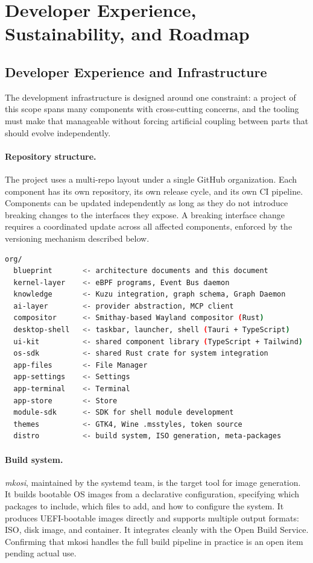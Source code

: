 \section{Developer Experience, Sustainability, and Roadmap}
\label{sec:sustainability}

\subsection{Developer Experience and Infrastructure}
\label{sec:devex}

The development infrastructure is designed around one constraint: a project of
this scope spans many components with cross-cutting concerns, and the tooling
must make that manageable without forcing artificial coupling between parts
that should evolve independently.

\paragraph{Repository structure.}
The project uses a multi-repo layout under a single GitHub organization. Each
component has its own repository, its own release cycle, and its own CI
pipeline. Components can be updated independently as long as they do not
introduce breaking changes to the interfaces they expose. A breaking interface
change requires a coordinated update across all affected components, enforced
by the versioning mechanism described below.

\begin{lstlisting}[language=bash, caption={Repository structure}]
org/
  blueprint       <- architecture documents and this document
  kernel-layer    <- eBPF programs, Event Bus daemon
  knowledge       <- Kuzu integration, graph schema, Graph Daemon
  ai-layer        <- provider abstraction, MCP client
  compositor      <- Smithay-based Wayland compositor (Rust)
  desktop-shell   <- taskbar, launcher, shell (Tauri + TypeScript)
  ui-kit          <- shared component library (TypeScript + Tailwind)
  os-sdk          <- shared Rust crate for system integration
  app-files       <- File Manager
  app-settings    <- Settings
  app-terminal    <- Terminal
  app-store       <- Store
  module-sdk      <- SDK for shell module development
  themes          <- GTK4, Wine .msstyles, token source
  distro          <- build system, ISO generation, meta-packages
\end{lstlisting}

\paragraph{Build system.}
\emph{mkosi}, maintained by the systemd team, is the target tool for image
generation. It builds bootable OS images from a declarative configuration,
specifying which packages to include, which files to add, and how to configure
the system. It produces UEFI-bootable images directly and supports multiple
output formats: ISO, disk image, and container. It integrates cleanly with the
Open Build Service. Confirming that mkosi handles the full build pipeline in
practice is an open item pending actual use.

